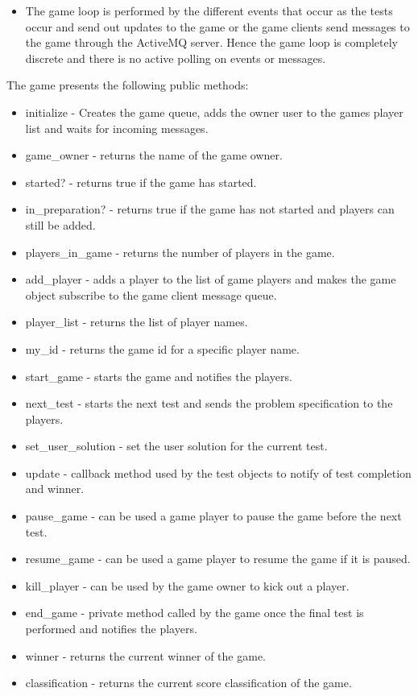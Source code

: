 \documentclass[a4paper,10pt,titlepage]{article}
\begin{document}
\begin{description}
\begin{itemize}
		\item The game loop is performed by the different events that occur as the tests occur and send out updates to the game or the game clients send messages to the game through the ActiveMQ server. Hence the game loop is completely discrete and there is no active polling on events or messages. 
	\end{itemize}
	The game presents the following public methods:
	\begin{itemize}
		\item initialize - Creates the game queue, adds the owner user to the games player list and waits for incoming messages.
		\item game\_owner - returns the name of the game owner.
		\item started? - returns true if the game has started.
		\item in\_preparation? - returns true if the game has not started and players can still be added.
		\item players\_in\_game - returns the number of players in the game.
		\item add\_player - adds a player to the list of game players and makes the game object subscribe to the game client message queue.
		\item player\_list - returns the list of player names.
		\item my\_id - returns the game id for a specific player name.
		\item start\_game - starts the game and notifies the players.
		\item next\_test - starts the next test and sends the problem specification to the players.
		\item set\_user\_solution - set the user solution for the current test.
		\item update - callback method used by the test objects to notify of test completion and winner.
		\item pause\_game - can be used a game player to pause the game before the next test.
		\item resume\_game - can be used a game player to resume the game if it is paused.
		\item kill\_player - can be used by the game owner to kick out a player.
		\item end\_game - private method called by the game once the final test is performed and notifies the players.
		\item winner - returns the current winner of the game.
		\item classification - returns the current score classification of the game.

\end{itemize}
\end{description}
\end{document}
